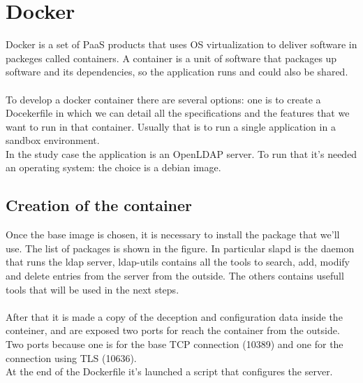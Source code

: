 \chapter{Docker}
Docker is a set of PaaS products that uses OS virtualization to deliver software in packeges called containers. A container is a unit of software that packages up software and its dependencies, so the application runs and could also be shared. 
\\\\
To develop a docker container there are several options: one is to create a Docekerfile in which we can detail all the specifications and the features that we want to run in that container. Usually that is to run a single application in a sandbox environment.  
\\
In the study case the application is an OpenLDAP server. To run that it’s needed an operating system: the choice is a debian image.
\section{Creation of the container}
Once the base image is chosen, it is necessary to install the package that we’ll use. The list of packages is shown in the figure. In particular slapd is the daemon that runs the ldap server, ldap-utils contains all the tools to search, add, modify and delete entries from the server from the outside. The others contains usefull tools that will be used in the next steps.  
\\
\\
After that it is made a copy of the deception and configuration data inside the conteiner, and are exposed two ports for reach the container from the outside. Two ports because one is for the base TCP connection (10389) and one for the connection using TLS (10636). 
\\
At the end of the Dockerfile it’s launched a script that configures the server.
